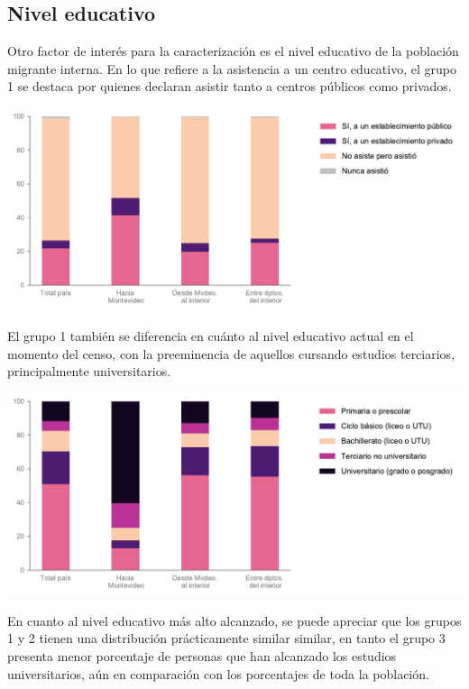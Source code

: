 \documentclass[12pt,spanish,]{article}
\let\origfigure\figure
\let\endorigfigure\endfigure
\renewenvironment{figure}[1][2] {
    \expandafter\origfigure\expandafter[H]
} {
    \endorigfigure
}
\begin{document}
\hypertarget{nivel-educativo}{%
\subsection{Nivel educativo}\label{nivel-educativo}}

Otro factor de interés para la caracterización es el nivel educativo de
la población migrante interna. En lo que refiere a la asistencia a un
centro educativo, el grupo 1 se destaca por quienes declaran asistir
tanto a centros públicos como privados.

\begin{figure}
\centering
\includegraphics{./tex2pdf.-8c1f0593c1a83dbe/14d3c1fbe2546fa9f3845f99c60d49f9d2180e27.pdf}
\caption{Asistencia a centros educativos.}
\end{figure}

El grupo 1 también se diferencia en cuánto al nivel educativo actual en
el momento del censo, con la preeminencia de aquellos cursando estudios
terciarios, principalmente universitarios.

\begin{figure}
\centering
\includegraphics{./tex2pdf.-8c1f0593c1a83dbe/b566f3c7e0aa02793c11dfed1ace2ea686608e1c.pdf}
\caption{Nivel educativo actual.}
\end{figure}

En cuanto al nivel educativo más alto alcanzado, se puede apreciar que
los grupos 1 y 2 tienen una distribución prácticamente similar similar,
en tanto el grupo 3 presenta menor porcentaje de personas que han
alcanzado los estudios universitarios, aún en comparación con los
porcentajes de toda la población.
\end{document}
